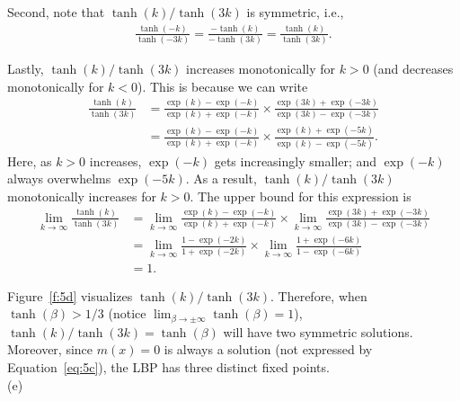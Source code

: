 \documentclass{article}
\newcommand{\qeds}{\hfill\qedsymbol}
\begin{document}
Second, note that $\tanh(k)/\tanh(3k)$ is symmetric, i.e., 
\begin{align*}
	\frac{\tanh(-k)}{\tanh(-3k)} = \frac{-\tanh(k)}{-\tanh(3k)} = \frac{\tanh(k)}{\tanh(3k)}.
\end{align*}

Lastly, $\tanh(k)/\tanh(3k)$ increases monotonically for $k>0$ (and decreases monotonically for $k<0$).
This is  because we can write
\begin{align*}
	\frac{\tanh(k)}{\tanh(3k)} &= \frac{\exp(k) - \exp(-k)}{\exp(k) + \exp(-k)}
	\times\frac{\exp(3k) + \exp(-3k)}{\exp(3k) - \exp(-3k)}\\
	&=\frac{\exp(k) - \exp(-k)}{\exp(k) + \exp(-k)}\times
	\frac{\exp(k) + \exp(-5k)}{\exp(k) - \exp(-5k)}.
\end{align*}
Here, as $k>0$ increases, $\exp(-k)$ gets increasingly smaller; and $\exp(-k)$ always overwhelms $\exp(-5k)$.
As a result, $\tanh(k)/\tanh(3k)$ monotonically increases for $k>0$. The upper bound for this expression is
\begin{align*}
	\lim_{k\to\infty}\frac{\tanh(k)}{\tanh(3k)} &= 
	\lim_{k\to\infty}\frac{\exp(k) - \exp(-k)}{\exp(k) + \exp(-k)}
	\times\lim_{k\to\infty}\frac{\exp(3k) + \exp(-3k)}{\exp(3k) - \exp(-3k)}\\
	&= \lim_{k\to\infty}\frac{1 - \exp(-2k)}{1 + \exp(-2k)}
	\times\lim_{k\to\infty}\frac{1 + \exp(-6k)}{1 - \exp(-6k)}\\
	&= 1.
\end{align*}

Figure~\ref{f:5d} visualizes $\tanh(k)/\tanh(3k)$. Therefore, when $\tanh(\beta) > 1/3$ (notice 
$\lim_{\beta\to\pm\infty}\tanh(\beta)=1$), $\tanh(k)/\tanh(3k) = \tanh(\beta)$ will have two
symmetric solutions. Moreover, since $m(x) = 0$ is always a solution (not expressed by Equation~\eqref{eq:5c}),
the LBP has three distinct fixed points. \qeds
\\

\noindent
(e)
\end{document}
